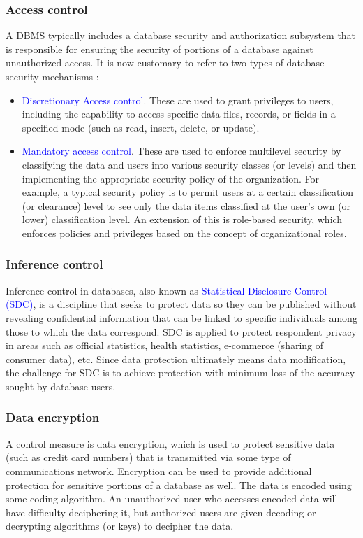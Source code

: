 \documentclass[a4paper]{article}
\numberwithin{equation}{section}
\begin{document}
\subsubsection{Access control}
A DBMS typically includes a database security and authorization subsystem that is responsible for ensuring the security of portions of a database against unauthorized access. It is now customary to refer to two types of database security mechanisms :
\begin{itemize}
  \item \textcolor{blue}{Discretionary Access control}. These are used to grant privileges to users, including the capability to access specific data files, records, or fields in a specified mode (such as read, insert, delete, or update).
  \item \textcolor{blue}{Mandatory access control}. These are used to enforce multilevel security by classifying the data and users into various security classes (or levels) and then implementing the appropriate security policy of the organization. For example, a typical security policy is to permit users at a certain classification (or clearance) level to see only the data items classified at the user’s own (or lower) classification level. An extension of this is role-based security, which enforces policies and privileges based on the concept of organizational roles.
\end{itemize}

\subsubsection{Inference control}
Inference control in databases, also known as \textcolor{blue}{Statistical Disclosure Control (SDC)}, is a discipline that seeks to protect data so they can be published without revealing confidential information that can be linked to specific individuals among those to which the data correspond. SDC is applied to protect respondent privacy in areas such as official statistics, health statistics, e-commerce (sharing of consumer data), etc. Since data protection ultimately means data modification, the challenge for SDC is to achieve protection with minimum loss of the accuracy sought by database users.

\subsubsection{Data encryption}
A control measure is data encryption, which is used to protect sensitive data (such as credit card numbers) that is transmitted via some type of communications network. Encryption can be used to provide additional protection for sensitive portions of a database as well. The data is encoded using some coding algorithm. An unauthorized user who accesses encoded data will have difficulty deciphering it, but authorized users are given decoding or decrypting algorithms (or keys) to decipher the data.
\end{document}

